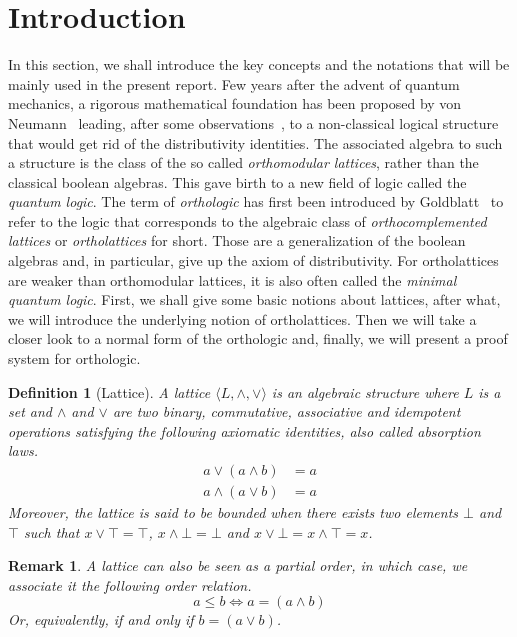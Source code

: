 \documentclass[a4paper, 11pt]{article}
\newtheorem{definition}[theorem]{Definition}
\newtheorem*{remark}{Remark}
\begin{document}
	\newpage
    \section{Introduction}
    In this section, we shall introduce the key concepts and the notations that will be mainly used in
    the present report. Few years after the advent of quantum mechanics, a rigorous mathematical 
    foundation has been proposed by von Neumann~\cite{30573279-e8ec-3f1e-b0ba-eaf73275f821} leading, 
    after some observations~\cite{2c73be7a-3de4-3824-8e11-49ebe4b183e4}, to a 
    non-classical logical structure that would get rid of the distributivity identities. 
    The associated algebra to such a structure is the class of the so
    called \textit{orthomodular lattices}, rather than the classical boolean algebras. This gave birth 
    to a new
    field of logic called the \textit{quantum logic}. The term of \textit{orthologic} has first been 
    introduced
    by Goldblatt~\cite{865e9aad-6de2-3b16-9861-412a9b18e683} to refer to the logic that corresponds to
    the algebraic class of \textit{orthocomplemented lattices} or \textit{ortholattices} for short.
    Those are a generalization of the boolean algebras and, in particular, give up the axiom of 
    distributivity. For ortholattices are weaker than orthomodular lattices, it is also
    often called the \textit{minimal quantum logic}. 
    First, we shall give some basic notions about lattices, after what, we will introduce the underlying 
    notion of ortholattices. Then we will take a closer look to
    a normal form of the orthologic and, finally, we will present a proof system for orthologic.
    \begin{definition}[Lattice]
	    A lattice $\langle L,\wedge,\vee\rangle$ is an algebraic structure where $L$ is a set and 
	    $\wedge$ and $\vee$ are two binary, commutative, associative and idempotent operations 
	    satisfying the
	    following axiomatic identities, also called \textit{absorption laws}.
	    \begin{align*}
		    a\vee(a\wedge b)&=a\\
		    a\wedge(a\vee b)&=a
	    \end{align*}
	    Moreover, the lattice is said to be bounded when there exists two elements $\bot$ and $\top$
	    such that $x\vee\top=\top$, $x\wedge\bot=\bot$ and $x\vee\bot=x\wedge\top=x$.
    \end{definition}
    \begin{remark}
    A lattice can also be seen as a partial order, in which case, we associate it the following order
    relation.
    \[
	a\leq b\Leftrightarrow a=(a\wedge b)
    \]
    Or, equivalently, if and only if $b=(a\vee b)$.	
    \end{remark}
\end{document}

